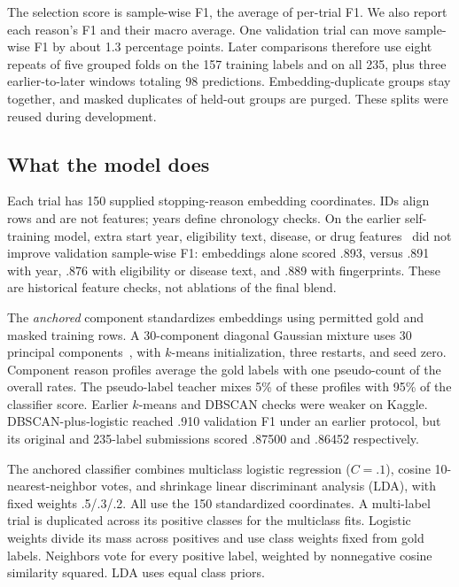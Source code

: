 \documentclass[10pt,twocolumn,letterpaper]{article}
\begin{document}
The selection score is sample-wise F1, the average of per-trial F1. We also
report each reason's F1 and their macro average. One validation trial can move
sample-wise F1 by about 1.3 percentage points. Later comparisons therefore use
eight repeats of five grouped folds on the 157 training labels and on all 235,
plus three earlier-to-later windows totaling 98 predictions. Embedding-duplicate
groups stay together, and masked duplicates of held-out groups are purged.
These splits were reused during development.

\subsection{What the model does}

Each trial has 150 supplied stopping-reason embedding coordinates. IDs align
rows and are not features; years define chronology checks. On the earlier
self-training model, extra start year, eligibility text, disease, or drug
features~\cite{rogers2010extended,rdkit,milacic2024reactome} did not improve
validation sample-wise F1: embeddings alone scored .893, versus .891 with year,
.876 with eligibility or disease text, and .889 with fingerprints. These are
historical feature checks, not ablations of the final blend.

The \emph{anchored} component standardizes embeddings using permitted gold and
masked training rows. A 30-component diagonal Gaussian mixture uses 30
principal components~\cite{dempster1977em,pedregosa2011scikit}, with $k$-means
initialization, three restarts, and seed zero. Component reason profiles average
the gold labels with one pseudo-count of the overall rates. The pseudo-label
teacher mixes 5\% of these profiles with 95\% of the classifier score.
Earlier $k$-means and DBSCAN checks were weaker on Kaggle. DBSCAN-plus-logistic
reached .910 validation F1 under an earlier protocol, but its original and
235-label submissions scored .87500 and .86452 respectively.

The anchored classifier combines multiclass logistic regression ($C=.1$),
cosine 10-nearest-neighbor votes, and shrinkage linear discriminant analysis
(LDA), with fixed weights .5/.3/.2. All use the 150 standardized coordinates.
A multi-label trial is duplicated across its positive classes for the
multiclass fits. Logistic weights divide its mass across positives and use
class weights fixed from gold labels. Neighbors vote for every positive label,
weighted by nonnegative cosine similarity squared. LDA uses equal class priors.
\end{document}
